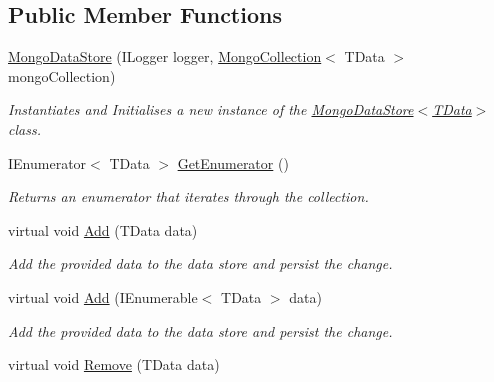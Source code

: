 \subsection*{Public Member Functions}
\begin{DoxyCompactItemize}
\item 
\hyperlink{classCqrs_1_1Mongo_1_1DataStores_1_1MongoDataStore_a39f738d53074a548e6932bacdc4a4e3a_a39f738d53074a548e6932bacdc4a4e3a}{Mongo\+Data\+Store} (I\+Logger logger, \hyperlink{classCqrs_1_1Mongo_1_1DataStores_1_1MongoDataStore_aa183a8ce44ec16d755f1e4fbe5ec4b10_aa183a8ce44ec16d755f1e4fbe5ec4b10}{Mongo\+Collection}$<$ T\+Data $>$ mongo\+Collection)
\begin{DoxyCompactList}\small\item\em Instantiates and Initialises a new instance of the \hyperlink{classCqrs_1_1Mongo_1_1DataStores_1_1MongoDataStore_a39f738d53074a548e6932bacdc4a4e3a_a39f738d53074a548e6932bacdc4a4e3a}{Mongo\+Data\+Store$<$\+T\+Data$>$} class. \end{DoxyCompactList}\item 
I\+Enumerator$<$ T\+Data $>$ \hyperlink{classCqrs_1_1Mongo_1_1DataStores_1_1MongoDataStore_a3eeaf3e59a540025ff2aa0f62b5dd465_a3eeaf3e59a540025ff2aa0f62b5dd465}{Get\+Enumerator} ()
\begin{DoxyCompactList}\small\item\em Returns an enumerator that iterates through the collection. \end{DoxyCompactList}\item 
virtual void \hyperlink{classCqrs_1_1Mongo_1_1DataStores_1_1MongoDataStore_a27bcfb40fe8203e09d320b2aa19fff3a_a27bcfb40fe8203e09d320b2aa19fff3a}{Add} (T\+Data data)
\begin{DoxyCompactList}\small\item\em Add the provided {\itshape data}  to the data store and persist the change. \end{DoxyCompactList}\item 
virtual void \hyperlink{classCqrs_1_1Mongo_1_1DataStores_1_1MongoDataStore_a38c242b255dc17cf8d19470fdf5a99bf_a38c242b255dc17cf8d19470fdf5a99bf}{Add} (I\+Enumerable$<$ T\+Data $>$ data)
\begin{DoxyCompactList}\small\item\em Add the provided {\itshape data}  to the data store and persist the change. \end{DoxyCompactList}\item 
virtual void \hyperlink{classCqrs_1_1Mongo_1_1DataStores_1_1MongoDataStore_a64003d01de3ac6ffd0e41bb7f572bf96_a64003d01de3ac6ffd0e41bb7f572bf96}{Remove} (T\+Data data)

\end{DoxyCompactItemize}
